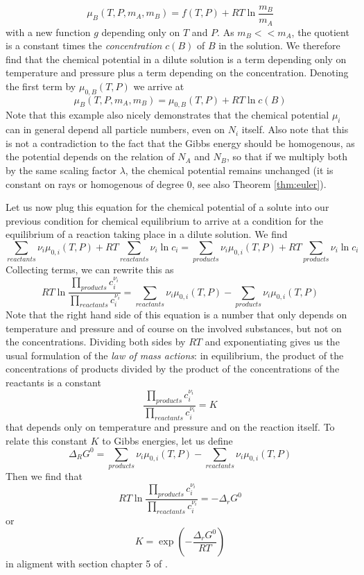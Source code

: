 \documentclass[a4paper, draft]{article}
\theoremstyle{own}
\theoremstyle{remark}
\begin{document}
$$
\mu_B(T, P, m_A, m_B) = f(T, P) + RT \ln \frac{m_B}{m_A} 
$$
with a new function $g$ depending only on $T$ and $P$. As $m_B << m_A$, the quotient is a constant times the {\em concentration} $c(B)$ of $B$ in the solution. We therefore find that the chemical potential in a dilute solution is a term depending only on temperature and pressure plus a term depending on the concentration. Denoting the first term by $\mu_{0, B}(T, P)$ we arrive at
$$
\mu_B(T, P, m_A, m_B) = \mu_{0, B}(T, P) + R T \ln c(B)
$$
Note that this example also nicely demonstrates that the chemical potential $\mu_i$ can in general depend all particle numbers, even on $N_i$ itself. Also note that this is not a contradiction to the fact that the Gibbs energy should be homogenous, as the potential depends on the relation of $N_A$ and $N_B$, so that if we multiply both by the same scaling factor $\lambda$, the chemical potential remains unchanged (it is constant on rays or homogenous of degree 0, see also Theorem \ref{thm:euler}).

Let us now plug this equation for the chemical potential of a solute into our previous condition for chemical equilibrium to arrive at a condition for the equilibrium of a reaction taking place in a dilute solution. We find
$$
\sum_{reactants} \nu_i \mu_{0, i}(T, P) + RT \sum_{reactants} \nu_i \ln c_i = \sum_{products} \nu_i \mu_{0, i}(T, P) + RT \sum_{products} \nu_i \ln c_i
$$
Collecting terms, we can rewrite this as
$$
RT \ln \frac{\prod_{products} c_i^{\nu_i}}{\prod_{reactants} c_i^{\nu_i}} = \sum_{reactants} \nu_i \mu_{0, i}(T, P) - \sum_{products} \nu_i \mu_{0, i}(T, P)
$$
Note that the right hand side of this equation is a number that only depends on temperature and pressure and of course on the involved substances, but not on the concentrations. 
Dividing both sides by $RT$ and exponentiating gives us the usual formulation of the {\em law of mass actions}: in equilibrium, the product of the concentrations of products divided by the product of the concentrations of the reactants is a constant
$$
\frac{\prod_{products} c_i^{\nu_i}}{\prod_{reactants} c_i^{\nu_i}} = K
$$
that depends only on temperature and pressure and on the reaction itself. To relate this constant $K$ to Gibbs energies, let us define
$$
\Delta_R G^0 =   \sum_{products} \nu_i \mu_{0, i}(T, P) - \sum_{reactants} \nu_i \mu_{0, i}(T, P)
$$
Then we find that
$$
RT \ln \frac{\prod_{products} c_i^{\nu_i}}{\prod_{reactants} c_i^{\nu_i}} =  - \Delta_r G^0
$$
or
$$
K = \exp (- \frac{\Delta_r G^0}{R T})
$$
in aligment with section chapter 5 of \cite{Schroeder}.
\end{document}
